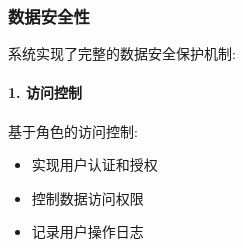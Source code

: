 \subsubsection{数据安全性}

系统实现了完整的数据安全保护机制:

\paragraph{1. 访问控制}
基于角色的访问控制:
\begin{itemize}
    \item 实现用户认证和授权
    \item 控制数据访问权限
    \item 记录用户操作日志
\end{itemize}

